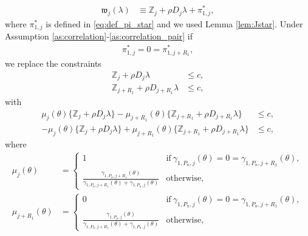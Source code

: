 \documentclass[letterpaper,11pt]{article}
\theoremstyle{myplain}
\theoremstyle{mydefinition}
\theoremstyle{myremark}
\newcommand{\HH}{\mathbb{Z}}
\numberwithin{equation}{section}
\numberwithin{figure}{section}
\begin{document}
\begin{appendices}
\begin{align}
\mathfrak{w}_{j}(\lambda)&\equiv \HH_{j}+\rho D_{j}\lambda+\pi^*_{1,j},\label{eq:wj}
\end{align}
where $\pi_{1,j}^*$ is defined in \eqref{eq:def_pi_star} and we used Lemma \ref{lem:Jstar}. Under Assumption \ref{as:correlation}-\ref{as:correlation_pair} if 
\begin{align}
\pi_{1,j}^*=0=\pi_{1,j+R_1}^*,\label{eq:paired_bind}
\end{align}
we replace the constraints
\begin{align}
 \HH_{j}+\rho D_{j}\lambda &\le c, \label{eq:paired_bind_R2L}\\
\HH_{j+R_1}+\rho D_{j+R_1}\lambda &\le c, \label{eq:paired_bind_R2U}	
\end{align}
with 
\begin{align}
\mu_j(\theta)\{ \HH_{j}+\rho D_{j}\lambda\} - \mu_{j+R_1}(\theta)\{\HH_{j+R_1}+\rho D_{j+R_1}\lambda\} &\le c,\label{eq:paired_bind_R4L}\\
-\mu_j(\theta)\{ \HH_{j}+\rho D_{j}\lambda\} + \mu_{j+R_1}(\theta)\{\HH_{j+R_1}+\rho D_{j+R_1}\lambda\} &\le c,\label{eq:paired_bind_R4U}	
\end{align}
where
\begin{align}
\mu_j(\theta) &=\left\{\begin{matrix}
 1 & \mathrm{if}~ \gamma_{1,P_n,j}(\theta)=0=\gamma_{1,P_n,j+R_1}(\theta),\\
\frac{\gamma_{1,P_n,j+R_1}(\theta)}{\gamma_{1,P_n,j+R_1}(\theta)+\gamma_{1,P_n,j}(\theta)} & \mathrm{otherwise},
\end{matrix}\right. \label{eq:weight_j}\\
\mu_{j+R_1}(\theta)&=\left\{\begin{matrix}
 0 & \mathrm{if}~ \gamma_{1,P_n,j}(\theta)=0=\gamma_{1,P_n,j+R_1}(\theta),\\
\frac{\gamma_{1,P_n,j}(\theta)}{\gamma_{1,P_n,j+R_1}(\theta)+\gamma_{1,P_n,j}(\theta)} & \mathrm{otherwise},
\end{matrix}\right. \label{eq:weight_j_pl_J11}
\end{align}



\end{appendices}
\end{document}
